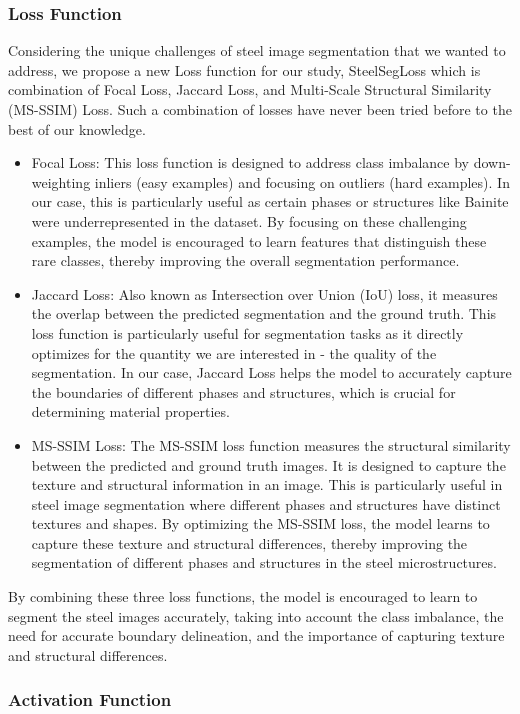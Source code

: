\documentclass[]{article}
\begin{document}
\subsubsection{Loss Function}
Considering the unique challenges of steel image segmentation that we wanted to address, we propose a new Loss function for our study, SteelSegLoss which is combination of Focal Loss, Jaccard Loss, and Multi-Scale Structural Similarity (MS-SSIM) Loss. Such a combination of losses have never been tried before to the best of our knowledge.
\begin{itemize}
	\item Focal Loss: This loss function is designed to address class imbalance by down-weighting inliers (easy examples) and focusing on outliers (hard examples). In our case, this is particularly useful as certain phases or structures like Bainite were underrepresented in the dataset. By focusing on these challenging examples, the model is encouraged to learn features that distinguish these rare classes, thereby improving the overall segmentation performance.
	\item Jaccard Loss: Also known as Intersection over Union (IoU) loss, it measures the overlap between the predicted segmentation and the ground truth. This loss function is particularly useful for segmentation tasks as it directly optimizes for the quantity we are interested in - the quality of the segmentation. In our case, Jaccard Loss helps the model to accurately capture the boundaries of different phases and structures, which is crucial for determining material properties.
	\item MS-SSIM Loss: The MS-SSIM loss function measures the structural similarity between the predicted and ground truth images. It is designed to capture the texture and structural information in an image. This is particularly useful in steel image segmentation where different phases and structures have distinct textures and shapes. By optimizing the MS-SSIM loss, the model learns to capture these texture and structural differences, thereby improving the segmentation of different phases and structures in the steel microstructures.
\end{itemize}

By combining these three loss functions, the model is encouraged to learn to segment the steel images accurately, taking into account the class imbalance, the need for accurate boundary delineation, and the importance of capturing texture and structural differences.

\subsubsection{Activation Function}
\end{document}
